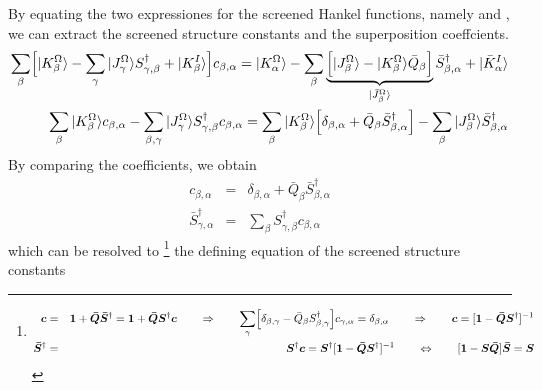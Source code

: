\documentclass[11pt,a4paper]{report}
\begin{document}
By equating the two expressiones for the screened Hankel functions,
namely  and , we can
extract the screened structure constants and the superposition
coeffcients.
\begin{eqnarray}
\sum_\beta\Bigl[|K^\Omega_{\beta}\rangle
-\sum_{\gamma}|J^\Omega_{\gamma}\rangle S^\dagger_{\gamma,\beta}
+|K^I_{\beta}\rangle \Bigr]c_{\beta,\alpha}
=
|K^\Omega_{\alpha}\rangle
-\sum_{\beta}
\underbrace{\Bigl[|J^\Omega_{\beta}\rangle-|K^\Omega_{\beta}\rangle\bar{Q}_\beta\Bigr]}
_{|\bar{J}^\Omega_{\beta}\rangle} \bar{S}^\dagger_{\beta,\alpha}
+|\bar{K}^I_{\alpha}\rangle
\nonumber\\
\sum_\beta
|K^\Omega_{\beta}\rangle c_{\beta,\alpha}
-\sum_{\beta,\gamma}|J^\Omega_{\gamma}\rangle S^\dagger_{\gamma,\beta} c_{\beta,\alpha}
=
\sum_{\beta}|K^\Omega_{\beta}\rangle
\Bigl[\delta_{\beta,\alpha}+
\bar{Q}_\beta \bar{S}^\dagger_{\beta,\alpha}\Bigr]
-\sum_{\beta}|J^\Omega_{\beta}\rangle \bar{S}^\dagger_{\beta,\alpha}
\end{eqnarray}
By comparing the coefficients, we obtain
\begin{eqnarray}
c_{\beta,\alpha}&=&\delta_{\beta,\alpha}+
\bar{Q}_\beta \bar{S}^\dagger_{\beta,\alpha}
\label{eq:definingeqsystemforsbara}
\\
\bar{S}^\dagger_{\gamma,\alpha}&=&\sum_\beta S^\dagger_{\gamma,\beta} c_{\beta,\alpha}
\label{eq:definingeqsystemforsbar}
\label{eq:definingeqsystemforsbarb}
\end{eqnarray}
which can be resolved to
\footnote{
\begin{eqnarray}
\bm{c}&=&\bm{1}
+\bm{\bar{Q}}\bm{\bar{S}}^\dagger
=\bm{1}+\bm{\bar{Q}}\bm{S}^\dagger\bm{c}
\qquad
\Rightarrow\qquad\sum_\gamma \Bigl[\delta_{\beta,\gamma}
-\bar{Q}_\beta S^\dagger_{\beta,\gamma}\Bigr] c_{\gamma,\alpha}=\delta_{\beta,\alpha}
\qquad\Rightarrow\qquad
\bm{c}=[\bm{1}-\bm{\bar{Q}}\bm{S}^\dagger]^{-1}
\nonumber\\
\bm{\bar{S}}^\dagger&=&\bm{S}^\dagger\bm{c}
=\bm{S}^\dagger[\bm{1}-\bm{\bar{Q}}\bm{S}^\dagger]^{-1}
\qquad\Leftrightarrow\qquad
[\bm{1}-\bm{S}\bm{\bar{Q}}]\bm{\bar{S}}=\bm{S}
\end{eqnarray}
  } the defining
equation of the screened structure constants
\end{document}

